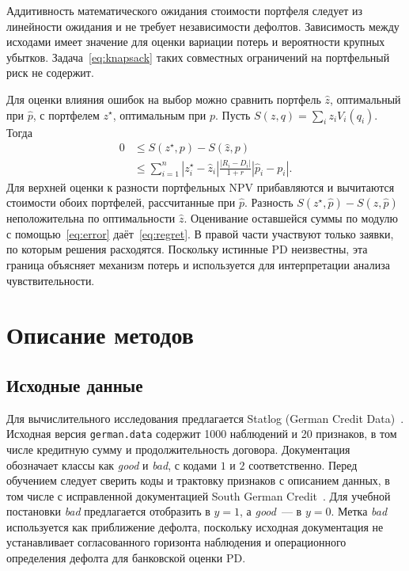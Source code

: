 \documentclass{misisarticle}
\begin{document}
Аддитивность математического ожидания стоимости портфеля следует из линейности ожидания и не требует независимости дефолтов. Зависимость между исходами имеет значение для оценки вариации потерь и вероятности крупных убытков. Задача~\eqref{eq:knapsack} таких совместных ограничений на портфельный риск не содержит.

Для оценки влияния ошибок на выбор можно сравнить портфель $\hat z$, оптимальный при $\hat p$, с портфелем $z^\star$, оптимальным при $p$. Пусть $S(z,q)=\sum_i z_i V_i(q_i)$. Тогда
\begin{equation}
  \begin{aligned}
    0 &\le S(z^\star,p)-S(\hat z,p)\\
      &\le \sum_{i=1}^n |z_i^\star-\hat z_i|
        \frac{|R_i-D_i|}{1+r}|\hat p_i-p_i|.
  \end{aligned}
  \label{eq:regret}
\end{equation}
Для верхней оценки к разности портфельных NPV прибавляются и вычитаются стоимости обоих портфелей, рассчитанные при $\hat p$. Разность $S(z^\star,\hat p)-S(\hat z,\hat p)$ неположительна по оптимальности $\hat z$. Оценивание оставшейся суммы по модулю с помощью~\eqref{eq:error} даёт~\eqref{eq:regret}. В правой части участвуют только заявки, по которым решения расходятся. Поскольку истинные PD неизвестны, эта граница объясняет механизм потерь и используется для интерпретации анализа чувствительности.

\section{Описание методов}

\subsection{Исходные данные}

Для вычислительного исследования предлагается Statlog (German Credit Data)~\cite{uci}. Исходная версия \texttt{german.data} содержит 1000 наблюдений и 20 признаков, в том числе кредитную сумму и продолжительность договора. Документация обозначает классы как \textit{good} и \textit{bad}, с кодами $1$ и $2$ соответственно. Перед обучением следует сверить коды и трактовку признаков с описанием данных, в том числе с исправленной документацией South German Credit~\cite{south}. Для учебной постановки \textit{bad} предлагается отобразить в $y=1$, а \textit{good}~--- в $y=0$. Метка \textit{bad} используется как приближение дефолта, поскольку исходная документация не устанавливает согласованного горизонта наблюдения и операционного определения дефолта для банковской оценки PD.
\end{document}
